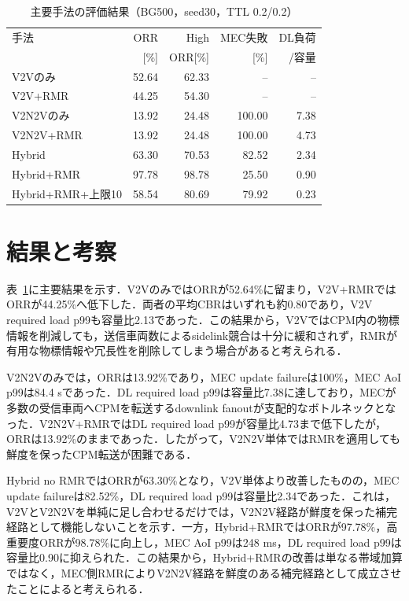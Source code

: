 \documentclass[a4paper,10pt,twocolumn,uplatex]{jsarticle}
\begin{document}
\begin{table}[t]
  \caption{主要手法の評価結果（BG500，seed30，TTL 0.2/0.2）}
  \label{tab:main_result}
  \centering
  \scriptsize
  \setlength{\tabcolsep}{2.2pt}
  \begin{tabular}{lrrrr}
    \hline
    手法 & ORR & High & MEC失敗 & DL負荷 \\
         & [\%] & ORR[\%] & [\%] & /容量 \\
    \hline \hline
    V2Vのみ & 52.64 & 62.33 & -- & -- \\
    V2V+RMR & 44.25 & 54.30 & -- & -- \\
    V2N2Vのみ & 13.92 & 24.48 & 100.00 & 7.38 \\
    V2N2V+RMR & 13.92 & 24.48 & 100.00 & 4.73 \\
    Hybrid & 63.30 & 70.53 & 82.52 & 2.34 \\
    Hybrid+RMR & 97.78 & 98.78 & 25.50 & 0.90 \\
    Hybrid+RMR+上限10 & 58.54 & 80.69 & 79.92 & 0.23 \\
    \hline
  \end{tabular}
\end{table}

\section{結果と考察}
表~\ref{tab:main_result}に主要結果を示す．V2VのみではORRが52.64\%に留まり，V2V+RMRではORRが44.25\%へ低下した．両者の平均CBRはいずれも約0.80であり，V2V required load p99も容量比2.13であった．この結果から，V2VではCPM内の物標情報を削減しても，送信車両数によるsidelink競合は十分に緩和されず，RMRが有用な物標情報や冗長性を削除してしまう場合があると考えられる．

V2N2Vのみでは，ORRは13.92\%であり，MEC update failureは100\%，MEC AoI p99は84.4 sであった．DL required load p99は容量比7.38に達しており，MECが多数の受信車両へCPMを転送するdownlink fanoutが支配的なボトルネックとなった．V2N2V+RMRではDL required load p99が容量比4.73まで低下したが，ORRは13.92\%のままであった．したがって，V2N2V単体ではRMRを適用しても鮮度を保ったCPM転送が困難である．

Hybrid no RMRではORRが63.30\%となり，V2V単体より改善したものの，MEC update failureは82.52\%，DL required load p99は容量比2.34であった．これは，V2VとV2N2Vを単純に足し合わせるだけでは，V2N2V経路が鮮度を保った補完経路として機能しないことを示す．一方，Hybrid+RMRではORRが97.78\%，高重要度ORRが98.78\%に向上し，MEC AoI p99は248 ms，DL required load p99は容量比0.90に抑えられた．この結果から，Hybrid+RMRの改善は単なる帯域加算ではなく，MEC側RMRによりV2N2V経路を鮮度のある補完経路として成立させたことによると考えられる．
\end{document}
